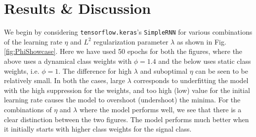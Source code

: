 \documentclass[%
reprint,
amsmath,amssymb,
aps,
]{revtex4-2}
\begin{document}
\section{Results \& Discussion}
We begin by considering \texttt{tensorflow.keras}'s \texttt{SimpleRNN} for various combinations of the learning rate $\eta$ and $L^2$ regularization parameter $\lambda$ as shown in Fig. \ref{fig:PhiShowcase}. Here we have used 50 epochs for both the figures, where the above uses a dynamical class weights with $\phi=1.4$ and the below uses static class weights, i.e. $\phi=1$. The difference for high $\lambda$ and suboptimal $\eta$ can be seen to be relatively small. In both the cases, large $\lambda$ corresponds to underfitting the model with the high suppression for the weights, and too high (low) value for the initial learning rate causes the model to overshoot (undershoot) the minima. For the combinations of $\eta$ and $\lambda$ where the model performs well, we see that there is a clear distinction between the two figures. The model performs much better when it initially starts with higher class weights for the signal class.
\end{document}
